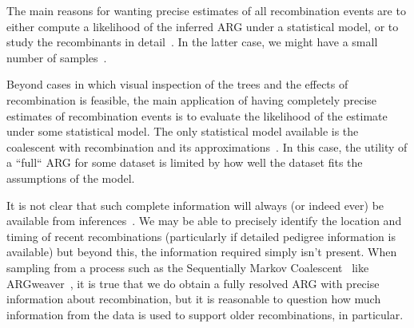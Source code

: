 \documentclass{article}
\begin{document}
The main reasons for wanting precise estimates of all recombination
events are to either compute a likelihood of the inferred ARG
under a statistical model, or to study the recombinants in
detail~\citep{rasmussen2022espalier}.
In the latter case, we might
have a small number of samples~\citep{guo2022recombination}.

Beyond cases in which visual inspection of the trees and the
effects of recombination is feasible, the main application
of having completely precise estimates of recombination events is
to evaluate the likelihood of the estimate under some
statistical model. The only statistical model available
is the coalescent with recombination
and its approximations~\citep{mcvean2005approximating,marjoram2006fast}.
In this case, the utility of a ``full`` ARG for some dataset
is limited by how well the dataset fits the assumptions
of the model.


It is not clear that such complete information will always
(or indeed ever) be available from inferences~\cite{shipilina2022origin}.
 We may be
able to precisely identify the location and timing
of recent recombinations (particularly if detailed pedigree
information is available) but beyond this, the information
required simply isn't present. When sampling from a
process such as the Sequentially Markov
Coalescent~\citep{mcvean2005approximating,marjoram2006fast}
like ARGweaver~\citep{rasmussen2014genome}, it is true that
we do obtain a fully resolved ARG with precise
information about recombination, but it is reasonable
to question how much information from the data is used
to support older recombinations, in particular.

\end{document}
